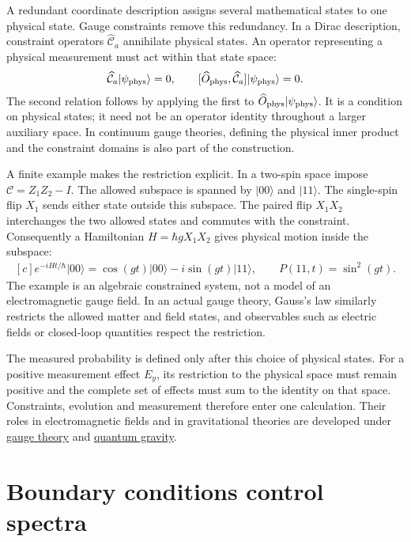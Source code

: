 \documentclass[11pt,oneside]{book}
\newenvironment{centeredalign}{\[\begin{gathered}[c]}{\end{gathered}\]}
\begin{document}
A redundant coordinate description assigns several mathematical states to
one physical state. Gauge constraints remove this redundancy. In a Dirac
description, constraint operators \(\widehat{\mathcal C}_a\) annihilate
physical states. An operator representing a physical measurement must act
within that state space:
\begin{centeredalign}
\widehat{\mathcal C}_a|\psi_{\rm phys}\rangle=0,\qquad
[\widehat O_{\rm phys},\widehat{\mathcal C}_a]
|\psi_{\rm phys}\rangle=0.
\end{centeredalign}
The second relation follows by applying the first to
\(\widehat O_{\rm phys}|\psi_{\rm phys}\rangle\). It is a condition on
physical states; it need not be an operator identity throughout a larger
auxiliary space. In continuum gauge theories, defining the physical inner
product and the constraint domains is also part of the construction.

A finite example makes the restriction explicit. In a two-spin space impose
\(\mathcal C=Z_1Z_2-I\). The allowed subspace is spanned by
\(|00\rangle\) and \(|11\rangle\). The single-spin flip \(X_1\) sends
either state outside this subspace. The paired flip \(X_1X_2\) interchanges
the two allowed states and commutes with the constraint. Consequently a
Hamiltonian \(H=\hbar gX_1X_2\) gives physical motion inside the subspace:
\begin{centeredalign}
e^{-iHt/\hbar}|00\rangle
=\cos(gt)|00\rangle-i\sin(gt)|11\rangle,\qquad
P(11,t)=\sin^2(gt).
\end{centeredalign}
The example is an algebraic constrained system, not a model of an
electromagnetic gauge field. In an actual gauge theory, Gauss's law similarly
restricts the allowed matter and field states, and observables such as
electric fields or closed-loop quantities respect the restriction.

The measured probability is defined only after this choice of physical
states. For a positive measurement effect \(E_y\), its restriction to the
physical space must remain positive and the complete set of effects must
sum to the identity on that space. Constraints, evolution and measurement
therefore enter one calculation. Their roles in electromagnetic fields and
in gravitational theories are developed under
\hyperref[topic:gauge-theory]{gauge theory} and
\hyperref[topic:quantum-gravity]{quantum gravity}.


\section{Boundary conditions control spectra}
\end{document}

